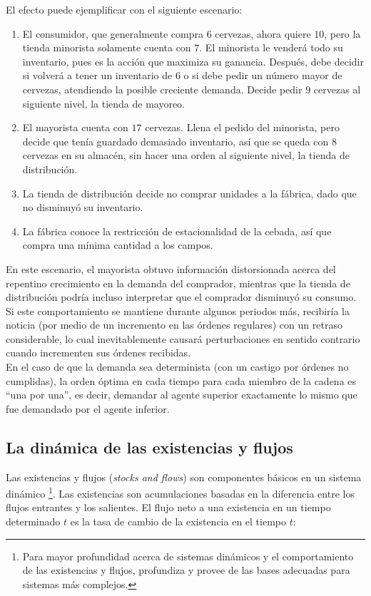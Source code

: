 El efecto puede ejemplificar con el siguiente escenario:

\begin{enumerate}
    \item El consumidor, que generalmente compra $6$ cervezas, ahora quiere $10$, pero la tienda minorista solamente cuenta con $7$. El minorista le venderá todo su inventario, pues es la acci\'on que maximiza su ganancia. Despu\'es, debe decidir si volverá a tener un inventario de $6$ o si debe pedir un número mayor de cervezas, atendiendo la posible creciente demanda. Decide pedir $9$ cervezas al siguiente nivel, la tienda de mayoreo.
    \item El mayorista cuenta con $17$ cervezas. Llena el pedido del minorista, pero decide que ten\'ia guardado demasiado inventario, as\'i que se queda con $8$ cervezas en su almac\'en, sin hacer una orden al siguiente nivel, la tienda de distribución.
    \item La tienda de distribuci\'on decide no comprar unidades a la f\'abrica, dado que no disminuy\'o su inventario.
    \item La f\'abrica conoce la restricci\'on de estacionalidad de la cebada, as\'i que compra una m\'inima cantidad a los campos.
\end{enumerate}

En este escenario, el mayorista obtuvo informaci\'on distorsionada acerca del repentino crecimiento en la demanda del comprador, mientras que la tienda de distribución podr\'ia incluso interpretar que el comprador disminuy\'o su consumo. Si este comportamiento se mantiene durante algunos periodos m\'as, recibir\'ia la noticia (por medio de un incremento en las \'ordenes regulares) con un retraso considerable, lo cual inevitablemente causar\'a perturbaciones en sentido contrario cuando incrementen sus \'ordenes recibidas.\\

En el caso de que la demanda sea determinista (con un castigo por \'ordenes no cumplidas), la orden \'optima en cada tiempo para cada miembro de la cadena es ``una por una'', es decir, demandar al agente superior exactamente lo mismo que fue demandado por el agente inferior.

\subsection{La din\'amica de las existencias y flujos}

Las existencias y flujos (\textit{stocks and flows}) son componentes b\'asicos en un sistema din\'amico \footnote{Para mayor profundidad acerca de sistemas din\'amicos y el comportamiento de las existencias y flujos, \citet{Sterman} profundiza y provee de las bases adecuadas para sistemas m\'as complejos.}. Las existencias son acumulaciones basadas en la diferencia entre los flujos entrantes y los salientes. El flujo neto a una existencia en un tiempo determinado $t$ es la tasa de cambio de la existencia en el tiempo $t$:

